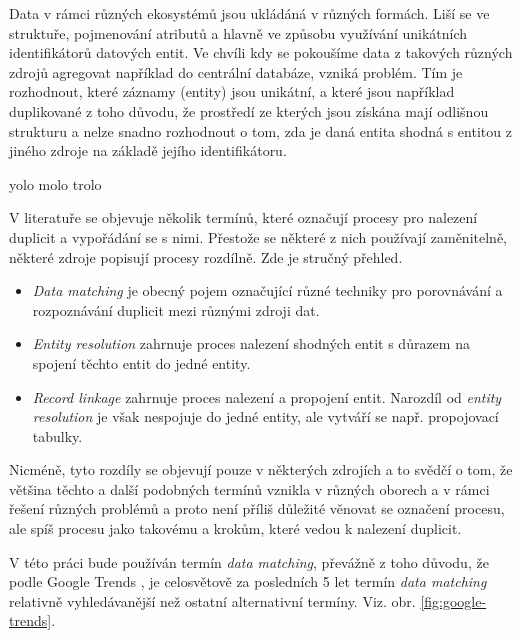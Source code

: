Data v rámci různých ekosystémů jsou ukládáná v různých formách. Liší se ve struktuře, pojmenování atributů a hlavně ve způsobu využívání unikátních identifikátorů datových entit. Ve chvíli kdy se pokoušíme data z takových různých zdrojů agregovat například do centrální databáze, vzniká problém. Tím je rozhodnout, které záznamy (entity) jsou unikátní, a které jsou například duplikované z toho důvodu, že prostředí ze kterých jsou získána mají odlišnou strukturu a nelze snadno rozhodnout o tom, zda je daná entita shodná s entitou z jiného zdroje na základě jejího identifikátoru.

yolo molo trolo

V literatuře se objevuje několik termínů, které označují procesy pro nalezení duplicit a vypořádání se s nimi. Přestože se některé z nich používají zaměnitelně, některé zdroje popisují procesy rozdílně. Zde je stručný přehled.

\begin{itemize}
    \item \textit{Data matching} je obecný pojem označující různé techniky pro porovnávání a rozpoznávání duplicit mezi různými zdroji dat.\cite{christen_data_2012}
    \item \textit{Entity resolution} zahrnuje proces nalezení shodných entit s důrazem na spojení těchto entit do jedné entity. \cite{quantexa_what_2024}
    \item \textit{Record linkage} zahrnuje proces nalezení a propojení entit. Narozdíl od \textit{entity resolution} je však nespojuje do jedné entity, ale vytváří se např. propojovací tabulky. \cite{stepanenko_what_2024}
\end{itemize}

Nicméně, tyto rozdíly se objevují pouze v některých zdrojích a to svědčí o tom, že většina těchto a další podobných termínů vznikla v různých oborech a v rámci řešení různých problémů a proto není příliš důležité věnovat se označení procesu, ale spíš procesu jako takovému a krokům, které vedou k nalezení duplicit.\cite{christen_data_2012}

V této práci bude používán termín  \textit{data matching}, převážně z toho důvodu, že podle Google Trends \cite{google_trends_google_2024}, je celosvětově za posledních 5 let termín \textit{data matching} relativně vyhledávanější než ostatní alternativní termíny. Viz. obr. \ref{fig:google-trends}.


